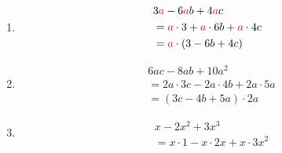 \begin{beispiel}
	\begin{enumerate}
		\item 
			\begin{align*}
				&3\color{red}a\color{black}-6\color{red}a\color{black}b+4\color{red}a\color{black}c\\
				&=\color{red}a\color{black}\cdot3+\color{red}a\color{black}\cdot6b+\color{red}a\color{black}\cdot4c\\
				&=\color{red}a\color{black}\cdot(3-6b+4c)
			\end{align*}
		\item 
			\begin{align*}
				&6ac-8ab+10a^2\\
				&=2a\cdot 3c-2a\cdot 4b+2a\cdot5a\\
				&=(3c-4b+5a)\cdot2a
			\end{align*}
		\item 
			\begin{align*}
				&x-2x^2+3x^3\\
				&=x\cdot 1-x\cdot 2x+x\cdot 3x^2
			\end{align*}
	\end{enumerate}
\end{beispiel}
\pagebreak



